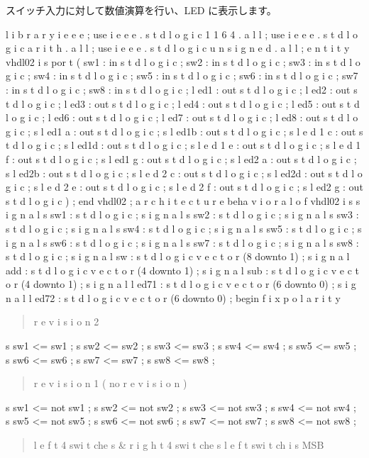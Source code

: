 \documentclass[letterpaper,10pt,dvipdfmx]{sphinxmanual}
\begin{document}
スイッチ入力に対して数値演算を行い、LED に表示します。

l i b r a r y i e e e ;
use i e e e . s t d l o g i c 1 1 6 4 . a l l ;
use i e e e . s t d l o g i c a r i t h . a l l ;
use i e e e . s t d l o g i c u n s i g n e d . a l l ;
e n t i t y vhdl02 i s
por t (
sw1 : in s t d l o g i c ;
sw2 : in s t d l o g i c ;
sw3 : in s t d l o g i c ;
sw4 : in s t d l o g i c ;
sw5 : in s t d l o g i c ;
sw6 : in s t d l o g i c ;
sw7 : in s t d l o g i c ;
sw8 : in s t d l o g i c ;
l ed1 : out s t d l o g i c ;
l ed2 : out s t d l o g i c ;
l ed3 : out s t d l o g i c ;
l ed4 : out s t d l o g i c ;
l ed5 : out s t d l o g i c ;
l ed6 : out s t d l o g i c ;
l ed7 : out s t d l o g i c ;
l ed8 : out s t d l o g i c ;
s l ed1 a : out s t d l o g i c ;
s l ed1b : out s t d l o g i c ;
s l e d 1 c : out s t d l o g i c ;
s l ed1d : out s t d l o g i c ;
s l e d 1 e : out s t d l o g i c ;
s l e d 1 f : out s t d l o g i c ;
s l ed1 g : out s t d l o g i c ;
s l ed2 a : out s t d l o g i c ;
s l ed2b : out s t d l o g i c ;
s l e d 2 c : out s t d l o g i c ;
s l ed2d : out s t d l o g i c ;
s l e d 2 e : out s t d l o g i c ;
s l e d 2 f : out s t d l o g i c ;
s l ed2 g : out s t d l o g i c
) ;
end vhdl02 ;
a r c h i t e c t u r e beha v i o r a l o f vhdl02 i s
s i g n a l s sw1 : s t d l o g i c ;
s i g n a l s sw2 : s t d l o g i c ;
s i g n a l s sw3 : s t d l o g i c ;
s i g n a l s sw4 : s t d l o g i c ;
s i g n a l s sw5 : s t d l o g i c ;
s i g n a l s sw6 : s t d l o g i c ;
s i g n a l s sw7 : s t d l o g i c ;
s i g n a l s sw8 : s t d l o g i c ;
s i g n a l sw : s t d l o g i c v e c t o r (8 downto 1) ;
s i g n a l add : s t d l o g i c v e c t o r (4 downto 1) ;
s i g n a l sub : s t d l o g i c v e c t o r (4 downto 1) ;
s i g n a l l ed71 : s t d l o g i c v e c t o r (6 downto 0) ;
s i g n a l l ed72 : s t d l o g i c v e c t o r (6 downto 0) ;
begin  f i x p o l a r i t y
\begin{quote}

r e v i s i o n 2
\end{quote}

s sw1 \textless{}= sw1 ;
s sw2 \textless{}= sw2 ;
s sw3 \textless{}= sw3 ;
s sw4 \textless{}= sw4 ;
s sw5 \textless{}= sw5 ;
s sw6 \textless{}= sw6 ;
s sw7 \textless{}= sw7 ;
s sw8 \textless{}= sw8 ;
\begin{quote}

r e v i s i o n 1 ( no r e v i s i o n )
\end{quote}

s sw1 \textless{}= not sw1 ;
s sw2 \textless{}= not sw2 ;
s sw3 \textless{}= not sw3 ;
s sw4 \textless{}= not sw4 ;
s sw5 \textless{}= not sw5 ;
s sw6 \textless{}= not sw6 ;
s sw7 \textless{}= not sw7 ;
s sw8 \textless{}= not sw8 ;
\begin{quote}

l e f t 4 swi t che s \& r i g h t 4 swi t che s
l e f t swi t ch i s MSB
\end{quote}
\end{document}

